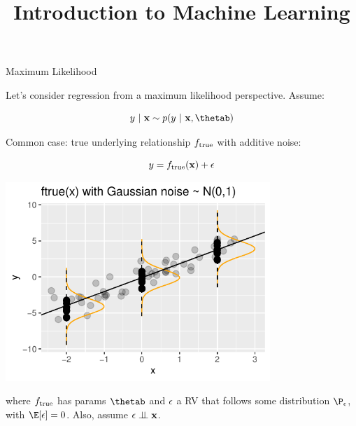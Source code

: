 \documentclass[11pt,compress,t,notes=noshow, xcolor=table]{beamer}
\title{Introduction to Machine Learning}
\begin{document}
    

\begin{vbframe}{Maximum Likelihood}

Let's consider regression from a maximum likelihood perspective. Assume: 

$$
	y~|~ \xv \sim p(y~|~\xv, \thetab) 
$$

\vspace{0.5cm}

Common case: 
true underlying relationship $f_{\text{true}}$ with additive noise: 

\vspace{0.5cm}

\begin{minipage}{0.5\textwidth}
$$
y = f_{\text{true}}(\mathbf{x}) + \epsilon
$$
\end{minipage}%
\begin{minipage}{0.5\textwidth}
\includegraphics[width = 0.75\textwidth]{figure/ftrue.pdf}
\end{minipage}

where $f_{\text{true}}$ has params $\thetab$ and $\epsilon$ a RV that follows some distribution $\P_\eps$, with $\E[\eps] = 0$. Also, assume $\epsilon \perp \!\!\! \perp \mathbf{x}$. 


\framebreak 


\end{vbframe}
\end{document}
